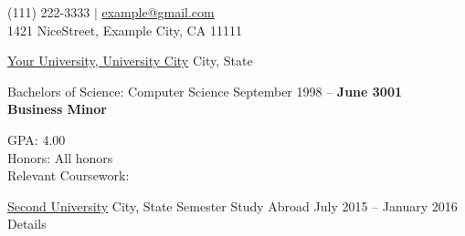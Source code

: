 \documentclass[10pt,a4paper]{article}
\newcommand{\dotfillshr}{\vspace{-0.8em}\dotfill}
\begin{document}
\sloppy  %

\begin{center}
\endcenter

\vspace{-2em}

\begin{center}
\bigskip
(111) 222-3333 $|$ 
\noindent\href{mailto:example@example.com}{example\mbox{}@\mbox{}gmail.com}\\
\hspace{0.2em} 1421 NiceStreet, Example City, CA 11111
\end{center}

\vspace{-1.0em}
\dotfillshr


\headedsection
  {\href{http://www.youruniversity.edu}{Your University, University City}}
  {City, State} 
  {%
  \headedsubsection
    {Bachelors of Science: Computer Science}
    {September 1998 -- {\bfseries{June 3001}}}
   \\ \hspace{1.2em} {\bfseries{{Business Minor}}}
    
    {
      \bodytext
      {
        GPA: 4.00\\Honors: All honors\\
        Relevant Coursework:\\
      }
    }
  }


\headedsection
  {\href{http://www.otheruniversity.edu/}{Second University}}
  {City, State} 
  {%
  \headedsubsection
    {Semester Study Abroad}
    {July 2015 -- January 2016}
    {
    \bodytext
    {
      \sbull Details 
    }
    }
  }



\end{center}
\end{document}
